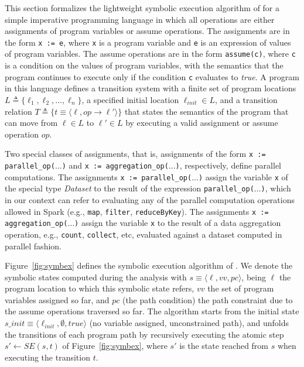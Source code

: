 This section formalizes the lightweight symbolic execution algorithm of \approach for a simple imperative programming language in which all operations are either assignments of program variables or assume operations. The assignments are in the form \texttt{x := e}, where \texttt{x} is a program variable and \texttt{e} is an expression of values of program variables. The assume operations are in the form \texttt{assume(c)}, where \texttt{c} is a condition on the values of program variables, with the semantics that the program continues to execute only if the condition \texttt{c} evaluates to \emph{true}. 
A program in this language defines a transition system with a finite set of program locations $L \triangleq \{\ell_1, \ell_2, \dots, \ell_n\}$, a specified initial location $\ell_{init} \in L$, and a transition relation $T \triangleq \{t  \equiv \langle\ell, op \rightarrow \ell'\rangle\}$ that states the semantics of the program that can move from $\ell\in L$ to $\ell'\in L$ by executing a valid assignment or assume  operation $op$.

Two special classes of assignments, that is, assignments of the form \texttt{x := parallel\_op($\dots$)} and \texttt{x~:= aggregation\_op($\dots$)}, respectively, define parallel computations. 
The assignments \texttt{x := parallel\_op($\dots$)} assign the variable \texttt{x}
of the special type \emph{Dataset} to the result of the
expression \texttt{parallel\_op($\dots$)}, which in our context can refer to evaluating any of the parallel computation operations allowed in Spark (e.g., \texttt{map}, \texttt{filter}, \texttt{reduceByKey}).
The assignments \texttt{x~:= aggregation\_op($\dots$)} assign the variable \texttt{x}
to the result of a data aggregation operation, e.g., \texttt{count}, \texttt{collect}, etc, evaluated against a dataset computed in parallel fashion. 

Figure~\ref{fig:symbex} defines the symbolic execution algorithm of \approach. We denote the symbolic states computed during the analysis with $s \equiv \langle \ell, vv, pc\rangle$, being $\ell$ the program location to which this symbolic state refers, $vv$ the set of program variables assigned so far, and $pc$ (the path condition) the path constraint due to the assume operations traversed so far. The algorithm starts from the initial state $s\_{init} \equiv \langle \ell_{init}, \emptyset, true\rangle$ (no variable assigned, unconstrained path), and unfolds the transitions of each program path by recursively executing the atomic step $s'\gets SE(s, t)$ of Figure~\ref{fig:symbex}, where $s'$ is the state reached from $s$ when executing the transition $t$. 


